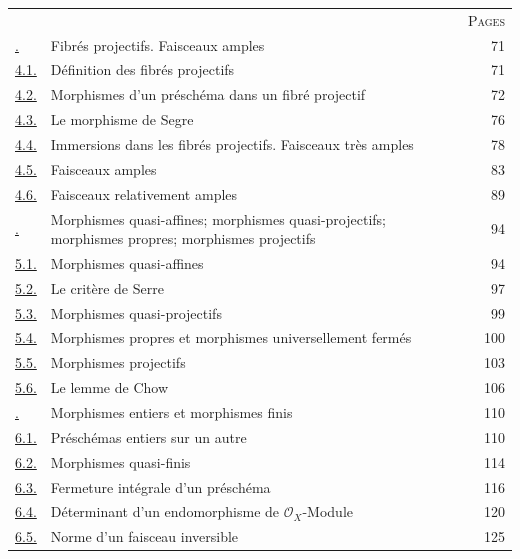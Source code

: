 \begin{longtable}{@{}p{}p{}r@{}}
 & & \textsc{Pages}\\
\hyperref[section:II.4-fr]{\textsection4.} & Fibrés projectifs. Faisceaux amples & 71\\
\hyperref[subsection:II.4.1-fr]{4.1.} & Définition des fibrés projectifs & 71\\
\hyperref[subsection:II.4.2-fr]{4.2.} & Morphismes d'un préschéma dans un fibré projectif & 72\\
\hyperref[subsection:II.4.3-fr]{4.3.} & Le morphisme de Segre & 76\\
\hyperref[subsection:II.4.4-fr]{4.4.} & Immersions dans les fibrés projectifs. Faisceaux très amples & 78\\
\hyperref[subsection:II.4.5-fr]{4.5.} & Faisceaux amples & 83\\
\hyperref[II.4.6-fr]{4.6.} & Faisceaux relativement amples & 89\\
\hyperref[section:II.5-fr]{\textsection5.} & Morphismes quasi-affines; morphismes quasi-projectifs; morphismes propres; morphismes projectifs & 94\\
\hyperref[subsection:II.5.1-fr]{5.1.} & Morphismes quasi-affines & 94\\
\hyperref[subsection:II.5.2-fr]{5.2.} & Le critère de Serre & 97\\
\hyperref[subsection:II.5.3-fr]{5.3.} & Morphismes quasi-projectifs & 99\\
\hyperref[subsection:II.5.4-fr]{5.4.} & Morphismes propres et morphismes universellement fermés & 100\\
\hyperref[subsection:II.5.5-fr]{5.5.} & Morphismes projectifs & 103\\
\hyperref[subsection:II.5.6-fr]{5.6.} & Le lemme de Chow & 106\\
\hyperref[section:II.6-fr]{\textsection6.} & Morphismes entiers et morphismes finis & 110\\
\hyperref[subsection:II.6.1-fr]{6.1.} & Préschémas entiers sur un autre & 110\\
\hyperref[subsection:II.6.2-fr]{6.2.} & Morphismes quasi-finis & 114\\
\hyperref[subsection:II.6.3-fr]{6.3.} & Fermeture intégrale d'un préschéma & 116\\
\hyperref[subsection:II.6.4-fr]{6.4.} & Déterminant d'un endomorphisme de $\mathcal{O}_X$-Module & 120\\
\hyperref[subsection:II.6.5-fr]{6.5.} & Norme d'un faisceau inversible & 125\\

\end{longtable}
